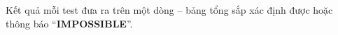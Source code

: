 Kết quả mỗi test đưa ra trên một dòng – bảng tổng sắp xác định được hoặc thông báo “\textbf{IMPOSSIBLE}”.